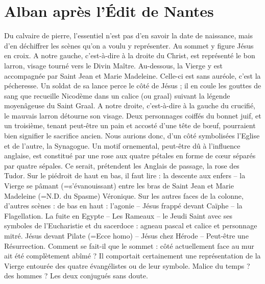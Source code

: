 

\section*{Alban après l'Édit de Nantes}

Du calvaire de pierre, l'essentiel n'est pas d'en savoir la date de naissance, mais d'en déchiffrer les scènes qu'on a voulu y représenter. Au sommet y figure Jésus en croix. A notre gauche, c'est-à-dire à la droite du Christ, est représenté le bon larron, visage tourné vers le Divin Maître. Au-dessous, la Vierge y est accompagnée par Saint Jean et Marie Madeleine. Celle-ci est sans auréole, c'est la pécheresse. Un soldat de sa lance perce le côté de Jésus ; il en coule les gouttes de sang que recueille Nicodème dans un calice (ou graal) suivant la légende moyenâgeuse du Saint Graal. A notre droite, c'est-à-dire à la gauche du crucifié, le mauvais larron détourne son visage. Deux personnages coiffés du bonnet juif, et un troisième, tenant peut-être un pain et accosté d'une tête de bœuf, pourraient bien signifier le sacrifice ancien. Nous aurions donc, d'un côté symbolisées l'Eglise et de l'autre, la Synagogue. Un motif ornemental, peut-être dû à l'influence anglaise, est constitué par une rose aux quatre pétales en forme de cœur séparés par quatre sépales. Ce serait, prétendent les Anglais de passage, la rose des Tudor. Sur le piédroit de haut en bas, il faut lire : la descente aux enfers -- la Vierge se pâmant (=s'évanouissant) entre les bras de Saint Jean et Marie Madeleine (=N.D. du Spasme) Véronique. Sur les autres faces de la colonne, d'autres scènes : de bas en haut : l'agonie -- Jésus frappé devant Caïphe -- la Flagellation. La fuite en Egypte -- Les Rameaux -- le Jeudi Saint avec ses symboles de l'Eucharistie et du sacerdoce : agneau pascal et calice et personnage mitré. Jésus devant Pilate (=Ecce homo) -- Jésus chez Hérode -- Peut-être une Résurrection. Comment se fait-il que le sommet : côté actuellement face au mur ait été complètement abîmé ? Il comportait certainement une représentation de la Vierge entourée des quatre évangélistes ou de leur symbole. Malice du temps ? des hommes ? Les deux conjugués sans doute.
